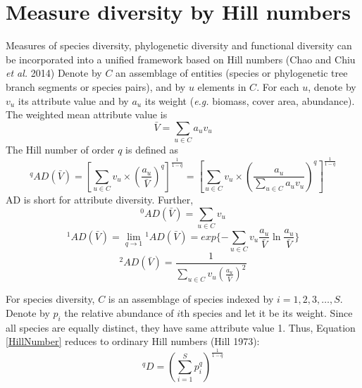 \documentclass[11pt]{article}
\begin{document}
\section{Measure diversity by Hill numbers}
Measures of species diversity, phylogenetic diversity and functional diversity can be incorporated into a unified framework based on Hill numbers (Chao and Chiu \textit{et al.} 2014)
Denote by $C$ an assemblage of entities (species or phylogenetic tree branch segments or species pairs), and by $u$ elements in $C$. 
For each $u$, denote by $v_u$ its attribute value and by $a_u$ its weight (\textit{e.g.} biomass, cover area, abundance). 
The weighted mean attribute value is
\begin{equation}
    \bar{V} = \sum\limits_{u\in C}a_uv_u
    \label{WeightedMeanAttributeValue}
\end{equation}
The Hill number of order $q$ is defined as 
\begin{equation}
    ^{q}AD(\bar{V}) = 
    [\sum\limits_{u\in C} v_u \times (\frac{a_u}{\bar{V}})^q]^{\frac{1}{1-q}} = [\sum\limits_{u\in C} v_u \times (\frac{a_u}{\sum\limits_{u\in C}a_uv_u})^q]^{\frac{1}{1-q}}
    \label{HillNumber}
\end{equation}
AD is short for attribute diversity. 
Further, 
\begin{equation}
    ^{0}AD(\bar{V}) = \sum\limits_{u\in C}v_u
\end{equation}
\begin{equation}
    ^{1}AD(\bar{V}) = \lim\limits_{q\rightarrow 1}{^{1}AD(\bar{V})} = exp\{-\sum\limits_{u\in C}v_u\frac{a_u}{\bar{V}}\ln\frac{a_u}{\bar{V}}\} 
\end{equation}
\begin{equation}
    ^{2}AD(\bar{V}) = \frac{1}{\sum\limits_{u\in C}v_u (\frac{a_u}{\bar{V}})^2}
\end{equation}

\newline

For species diversity, $C$ is an assemblage of species indexed by $i = 1,2,3,\dots,S$. 
Denote by $p_i$ the relative abundance of $i$th species and let it be its weight. 
Since all species are equally distinct, they have same attribute value 1. 
Thus, Equation \ref{HillNumber} reduces to ordinary Hill numbers (Hill 1973):
\begin{equation}
    ^{q}D = (\sum\limits_{i=1}^{S}p_i^q)^\frac{1}{1-q}
    \label{HillNUmber_Species}
\end{equation}

\newline
\end{document}
